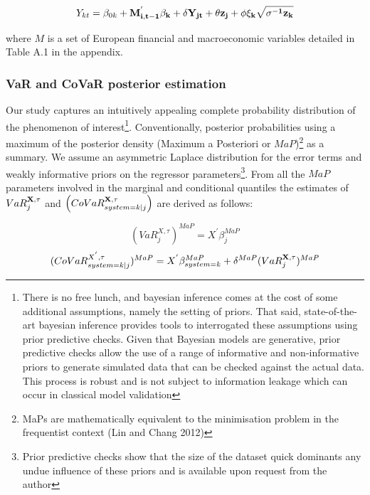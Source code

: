\documentclass[
  10pt,
]{article}
\begin{document}
\begin{equation}\label{eq:eq5}
Y_{kt}=\beta_{0k}+\bf{M^{'}_{i,t-1}} \bf{\beta_k} +\delta Y_{jt}+\theta z_j+\phi\xi_k\sqrt{\sigma^{-1}z_k}
\end{equation}

where \(M\) is a set of European financial and macroeconomic variables
detailed in Table A.1 in the appendix.

\hypertarget{var-and-covar-posterior-estimation}{%
\subsubsection{VaR and CoVaR posterior
estimation}\label{var-and-covar-posterior-estimation}}

Our study captures an intuitively appealing complete probability
distribution of the phenomenon of interest\footnote{There is no free
  lunch, and bayesian inference comes at the cost of some additional
  assumptions, namely the setting of priors. That said, state-of-the-art
  bayesian inference provides tools to interrogated these assumptions
  using prior predictive checks. Given that Bayesian models are
  generative, prior predictive checks allow the use of a range of
  informative and non-informative priors to generate simulated data that
  can be checked against the actual data. This process is robust and is
  not subject to information leakage which can occur in classical model
  validation}. Conventionally, posterior probabilities using a maximum
of the posterior density (Maximum a Posteriori or \(MaP\))\footnote{MaPs
  are mathematically equivalent to the minimisation problem in the
  frequentist context (Lin and Chang 2012)} as a summary. We assume an
asymmetric Laplace distribution for the error terms and weakly
informative priors on the regressor parameters\footnote{Prior predictive
  checks show that the size of the dataset quick dominants any undue
  influence of these priors and is available upon request from the
  author}. From all the \(MaP\) parameters involved in the marginal and
conditional quantiles the estimates of \(VaR^{\bf{X},\tau}_j\) and
\(\left( CoVaR_{system=k|j}^{\bf{X},\tau} \right)\) are derived as
follows:

\begin{equation}\label{eq:eq6}
(VaR^{X,\tau}_j)^{MaP} = X^{'}\beta_j^{MaP}
\end{equation} \begin{equation}\label{eq:eq7}
(CoVaR_{system=k|j}^{X^{'},\tau})^{MaP} = X^{'} \beta_{system=k}^{MaP}+\delta^{MaP}(VaR^{\bf{X},\tau}_j)^{MaP}
\end{equation}
\end{document}
